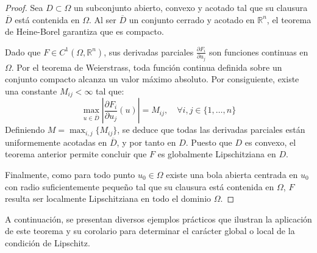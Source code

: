 \begin{proof}
    Sea $D \subset \Omega$ un subconjunto abierto, convexo y acotado tal que su clausura $\overline{D}$ está contenida en $\Omega$. Al ser $\overline{D}$ un conjunto cerrado y acotado en $\mathbb{R}^n$, el teorema de Heine-Borel garantiza que es compacto.
    
    Dado que $F \in C^1(\Omega, \mathbb{R}^n)$, sus derivadas parciales $\frac{\partial F_i}{\partial u_j}$ son funciones continuas en $\Omega$. Por el teorema de Weierstrass, toda función continua definida sobre un conjunto compacto alcanza un valor máximo absoluto. Por consiguiente, existe una constante $M_{ij} < \infty$ tal que:
    \[  
        \max_{u \in \overline{D}} \left| \frac{\partial F_i}{\partial u_j}(u) \right| = M_{ij}, \quad \forall i,j \in \{1, \ldots, n\}
    \]
    Definiendo $M = \max_{i,j} \{ M_{ij} \}$, se deduce que todas las derivadas parciales están uniformemente acotadas en $\overline{D}$, y por tanto en $D$. Puesto que $D$ es convexo, el teorema anterior permite concluir que $F$ es globalmente Lipschitziana en $D$. 
    
    Finalmente, como para todo punto $u_0 \in \Omega$ existe una bola abierta centrada en $u_0$ con radio suficientemente pequeño tal que su clausura está contenida en $\Omega$, $F$ resulta ser localmente Lipschitziana en todo el dominio $\Omega$.
\end{proof}

A continuación, se presentan diversos ejemplos prácticos que ilustran la aplicación de este teorema y su corolario para determinar el carácter global o local de la condición de Lipschitz.

